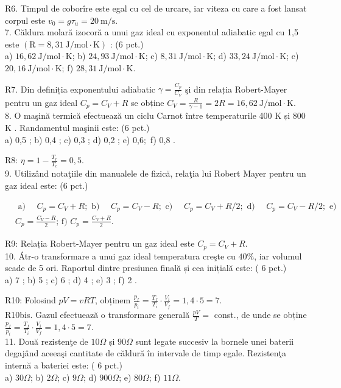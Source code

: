 R6. Timpul de coborîre este egal cu cel de urcare, iar viteza cu care a fost lansat corpul este $v_{0}=g \tau_{u}=20 \mathrm{~m} / \mathrm{s}$.\\
7. Căldura molară izocoră a unui gaz ideal cu exponentul adiabatic egal cu 1,5 este $(\mathrm{R}=8,31 \mathrm{~J} / \mathrm{mol} \cdot \mathrm{K})$ : (6 pct.)\\
a) $16,62 \mathrm{~J} / \mathrm{mol} \cdot \mathrm{K}$; b) $24,93 \mathrm{~J} / \mathrm{mol} \cdot \mathrm{K}$; c) $8,31 \mathrm{~J} / \mathrm{mol} \cdot \mathrm{K}$; d) $33,24 \mathrm{~J} / \mathrm{mol} \cdot \mathrm{K}$; e) $20,16 \mathrm{~J} / \mathrm{mol} \cdot \mathrm{K}$; f) $28,31 \mathrm{~J} / \mathrm{mol} \cdot \mathrm{K}$.

R7. Din definiția exponentului adiabatic $\gamma=\frac{C_{p}}{C_{V}}$ şi din relația Robert-Mayer pentru un gaz ideal $C_{p}=C_{V}+R$ se obține $C_{V}=\frac{R}{\gamma-1}=2 R=16,62 \mathrm{~J} / \mathrm{mol} \cdot \mathrm{K}$.\\
8. O maşină termică efectuează un ciclu Carnot între temperaturile 400 K și 800 K . Randamentul maşinii este: (6 pct.)\\
a) 0,5 ; b) 0,4 ; c) 0,3 ; d) 0,2 ; e) 0,$6 ;$ f) 0,8 .

R8: $\eta=1-\frac{T_{r}}{T_{c}}=0,5$.\\
9. Utilizând notaţiile din manualele de fizică, relaţia lui Robert Mayer pentru un gaz ideal este: (6 pct.)

$$
\begin{aligned}
& \text { a) } \quad C_{p}=C_{V}+R ; \text { b) } \quad C_{p}=C_{V}-R ; \text { c) } \quad C_{p}=C_{V}+R / 2 ; \text { d) } \quad C_{p}=C_{V}-R / 2 ; \text { e) } \\
& C_{p}=\frac{C_{V}-R}{2} \text {; f) } C_{p}=\frac{C_{V}+R}{2} .
\end{aligned}
$$

R9: Relația Robert-Mayer pentru un gaz ideal este $C_{p}=C_{V}+R$.\\
10. Átr-o transformare a unui gaz ideal temperatura creşte cu $40 \%$, iar volumul scade de 5 ori. Raportul dintre presiunea finală și cea inițială este: ( 6 pct.)\\
a) 7 ; b) 5 ; c) 6 ; d) 4 ; e) 3 ; f) 2 .

R10: Folosind $p V=v R T$, obținem $\frac{p_{f}}{p_{i}}=\frac{T_{f}}{T_{i}} \cdot \frac{V_{i}}{V_{f}}=1,4 \cdot 5=7$.\\
R10bis. Gazul efectuează o transformare generală $\frac{p V}{T}=$ const., de unde se obține $\frac{p_{f}}{p_{i}}=\frac{T_{f}}{T_{i}} \cdot \frac{V_{i}}{V_{f}}=1,4 \cdot 5=7$.\\
11. Două rezistenţe de $10 \Omega$ și $90 \Omega$ sunt legate succesiv la bornele unei baterii degajând aceeaşi cantitate de căldură în intervale de timp egale. Rezistenţa internă a bateriei este: ( 6 pct.)\\
a) $30 \Omega$; b) $2 \Omega$; c) $9 \Omega$; d) $900 \Omega$; e) $80 \Omega$; f) $11 \Omega$.

